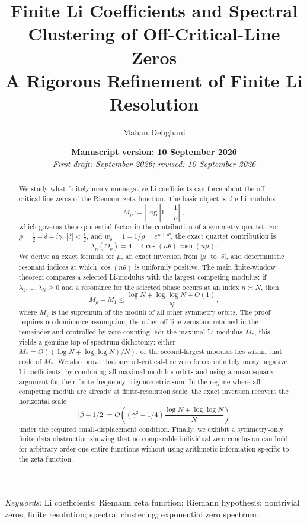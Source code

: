 \documentclass[11pt]{article}
\title{Finite Li Coefficients and Spectral Clustering of Off-Critical-Line Zeros\\
\large A Rigorous Refinement of Finite Li Resolution}
\author{Mahan Dehghani}
\date{\textbf{Manuscript version: 10 September 2026}\\[3pt]\textit{First draft: September 2026; revised: 10 September 2026}}
\newcommand{\Li}{\lambda}
\begin{document}
\maketitle

\begin{center}
\smallskip
\textit{Keywords:} Li coefficients; Riemann zeta function; Riemann hypothesis; nontrivial zeros; finite resolution; spectral clustering; exponential zero spectrum.
\end{center}

\begin{abstract}
We study what finitely many nonnegative Li coefficients can force about the off-critical-line zeros of the Riemann zeta function. The basic object is the Li-modulus
\[
M_\rho := \left|\log\left|1-\frac1\rho\right|\right|,
\]
which governs the exponential factor in the contribution of a symmetry quartet. For
\(\rho=\frac12+\delta+i\gamma\), \(|\delta|<\frac12\), and
\(w_\rho=1-1/\rho=e^{\mu+i\theta}\), the exact quartet contribution is
\[
\Li_n(O_\rho)=4-4\cos(n\theta)\cosh(n\mu).
\]
We derive an exact formula for \(\mu\), an exact inversion from \(|\mu|\) to \(|\delta|\), and deterministic resonant indices at which \(\cos(n\theta)\) is uniformly positive. The main finite-window theorem compares a selected Li-modulus with the largest competing modulus: if \(\Li_1,\ldots,\Li_N\ge0\) and a resonance for the selected phase occurs at an index \(n\asymp N\), then
\[
M_\rho-M_1 \le \frac{\log N+\log\log N+O(1)}{N},
\]
where \(M_1\) is the supremum of the moduli of all other symmetry orbits. The proof requires no dominance assumption; the other off-line zeros are retained in the remainder and controlled by zero counting. For the maximal Li-modulus \(M_*\), this yields a genuine top-of-spectrum dichotomy: either \(M_*=O((\log N+\log\log N)/N)\), or the second-largest modulus lies within that scale of \(M_*\). We also prove that any off-critical-line zero forces infinitely many negative Li coefficients, by combining all maximal-modulus orbits and using a mean-square argument for their finite-frequency trigonometric sum. In the regime where all competing moduli are already at finite-resolution scale, the exact inversion recovers the horizontal scale
\[
|\beta-1/2|=O\!\left((\gamma^2+1/4)\frac{\log N+\log\log N}{N}\right)
\]
under the required small-displacement condition. Finally, we exhibit a symmetry-only finite-data obstruction showing that no comparable individual-zero conclusion can hold for arbitrary order-one entire functions without using arithmetic information specific to the zeta function.
\end{abstract}
\end{document}
